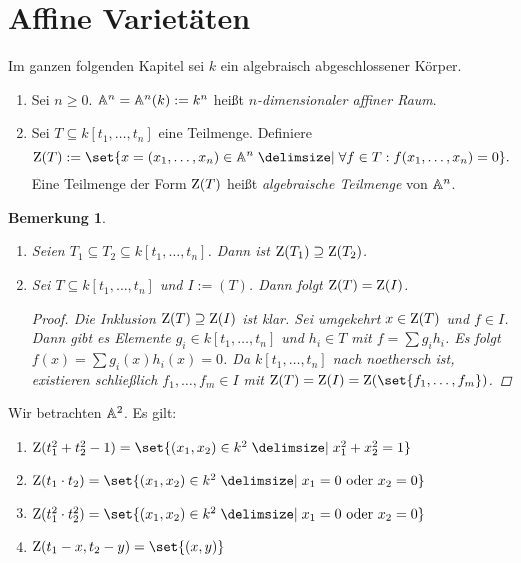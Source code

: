 \documentclass[12pt,a4paper]{scrartcl}
\theoremstyle{cplain}
\theoremstyle{cdef}
\newtheorem{beme}[thmcounter]{Bemerkung}
\begin{document}
\section{Affine Varietäten}
Im ganzen folgenden Kapitel sei $k$ ein algebraisch abgeschlossener Körper.
\begin{defi}
	\leavevmode
	\begin{enumerate}
		\item Sei $n\ge 0$. $\mathbb A^n= \mathbb A^n (k) := k^n$ heißt \emph{$n$-dimensionaler affiner Raum}.
		\item Sei $T\subseteq k[t_1,\dots, t_n]$ eine Teilmenge. Definiere 
		\[\Z(T) := \set{x = (x_1,\dots, x_n)\in\IA^n\given \forall f\in T: f(x_1,\dots, x_n) = 0}.\]
		Eine Teilmenge der Form $\operatorname{Z}(T)$ heißt \emph{algebraische Teilmenge} von $\mathbb A^n$. 
	\end{enumerate}
\end{defi}
\begin{beme} \label{bem:8.2}
	\leavevmode
	\begin{enumerate}
		\item Seien $T_1\subseteq T_2\subseteq k[t_1,\dots, t_n]$. Dann ist $\operatorname{Z}(T_1)\supseteq \operatorname{Z}(T_2)$. \label{bem:8.2:i}
		\item Sei $T\subseteq k[t_1,\dots, t_n]$ und $I := (T)$. Dann folgt $\operatorname{Z}(T) = \operatorname{Z}(I)$. \label{bem:8.2:ii}
		\begin{proof}
			Die Inklusion $\operatorname{Z}(T) \supseteq \operatorname{Z}(I)$ ist klar. Sei umgekehrt $x \in \operatorname{Z}(T)$ und $f\in I$. Dann gibt es Elemente $g_i \in k[t_1,\ldots,t_n]$ und $h_i\in T$ mit $f=\sum g_ih_i$. Es folgt $f(x) = \sum g_i(x)h_i(x) = 0$. Da $k[t_1,\ldots,t_n]$ nach  noethersch ist, existieren schließlich $f_1,\ldots,f_m \in I$ mit $\Z(T) = \Z(I) = \Z(\set{f_1,\ldots,f_m})$.
		\end{proof}
	\end{enumerate}
\end{beme}
\begin{bsp}
	Wir betrachten $\mathbb A^2$. Es gilt:
	\begin{enumerate}
		\item $\Z(t_1^2+t_2^2-1) = \set{(x_1,x_2)\in k^2 \given x_1^2+x_2^2 = 1}$
		\item $\Z(t_1\cdot t_2) = \set{(x_1,x_2)\in k^2\given x_1 = 0\text{ oder }x_2 = 0}$
		\item $\Z(t_1^2\cdot t_2^2) = \set{(x_1,x_2)\in k^2\given x_1 = 0\text{ oder }x_2 = 0}$
		\item $\Z(t_1-x, t_2-y) = \set{(x,y)}$
	\end{enumerate}
\end{bsp}
\end{document}
